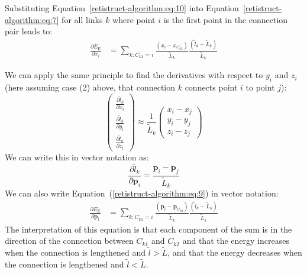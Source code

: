\documentclass{article}
\newcommand{\EE}{\ensuremath{E_\mathrm{E}}\xspace}
\renewcommand{\vec}[1]{\mathbf{#1}}
\begin{document}
Substituting Equation~\ref{retistruct-algorithm:eq:10} into
Equation~\ref{retistruct-algorithm:eq:7} for all links $k$ where point
$i$ is the first point in the connection pair leads to:
\begin{equation}
  \label{retistruct-algorithm:eq:9}
  \begin{split}
    \frac{\partial\EE}{\partial x_i} & = \sum_{k: C_{k1} = i}
      \frac{(x_i-x_{C_{k2}})}{\tilde L_k}
    \frac{(\tilde l_k- \tilde L_k)}{\tilde L_k}
  \end{split}
\end{equation}

We can apply the same principle to find the derivatives with respect
to $y_i$ and $z_i$ (here assuming case (2) above, that connection $k$
connects point $i$ to point $j$):
\begin{equation}
  \left(
    \begin{array}{c}
      \frac{\partial \tilde l_k}{\partial x_i} \\
      \frac{\partial \tilde l_k}{\partial y_i} \\
      \frac{\partial \tilde l_k}{\partial z_i}
    \end{array}
  \right) \approx
  \frac{1}{\tilde L_k}
  \left(
  \begin{array}{c}
    x_i-x_j \\
    y_i-y_j \\
    z_i-z_j
  \end{array}
  \right)
\end{equation}
We can write this in vector notation as:
\begin{equation}
  \label{retistruct-algorithm:eq:5}
  \frac{\partial \tilde l_k}{\partial \vec{p}_i} =   \frac{\vec{p}_i - \vec{p}_j}{\tilde L_k}
\end{equation}
We can also write Equation~(\ref{retistruct-algorithm:eq:9}) in vector notation:
\begin{equation}
  \label{retistruct-algorithm:eq:9}
  \begin{split}
    \frac{\partial\EE}{\partial \vec{p}_i} & = \sum_{k: C_{k1} = i}
      \frac{(\vec{p}_i-\vec{p}_{C_{k2}})}{\tilde L_k}
    \frac{(\tilde l_k- \tilde L_k)}{\tilde L_k}
  \end{split}
\end{equation}
The interpretation of this equation is that each component of the sum
is in the direction of the connection between $C_{k1}$ and $C_{k2}$
and that the energy increases when the connection is lengthened and
$\tilde l > \tilde L$, and that the energy decreases when the
connection is lengthened and $\tilde l < \tilde L$.
\end{document}
